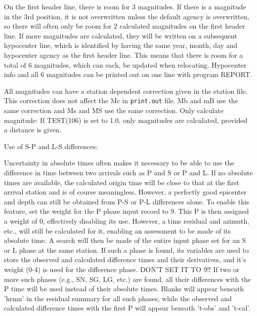 On the first header line, there is room for 3 magnitudes. If there 
is a magnitude in the 3rd position, it is not overwritten unless 
the default agency is overwritten, so there will often only be room 
for 2 calculated magnitudes on the first header line. 
If more 
magnitudes are calculated, they will be written on a subsequent 
hypocenter line, which is identified by having the same year, month, 
day and hypocenter agency as the first header line. This means that 
there is room for a total of 6 magnitudes, which can each, be updated 
when relocating. Hypocenter info and all 6 magnitudes can be printed 
out on one line with program REPORT.

All magnitudes can have a station dependent correction given in the 
station file. This correction does not affect the Mc in \texttt{print.out}
file. Mb and mB use the same correction and Ms and MS use the same correction.
Only calculate magnitude: If TEST(106) is set to 1.0, only magnitudes 
are calculated, provided a distance is given.

Use of S-P and L-S differences: 

Uncertainty in absolute times often makes it necessary to be able to 
use the difference in time between two arrivals such as P and S or 
P and L. If no absolute times are available, the calculated origin 
time will be close to that at the first arrival station and is of 
course meaningless. However, a perfectly good epicenter and depth 
can still be obtained from P-S or P-L differences alone. To enable 
this feature, set the weight for the P phase input record to 9. This 
P is then assigned a weight of 0, effectively disabling its use. 
However, a time residual and azimuth, etc., will still be calculated 
for it, enabling an assessment to be made of its absolute time. A 
search will then be made of the entire input phase set for an S or 
L phase at the same station. If such a phase is found, its variables 
are used to store the observed and calculated difference times and 
their derivatives, and it's weight (0-4) is used for the difference 
phase. DON'T SET IT TO 9!! If two or more such phases (e.g., SN, SG, LG, etc.) 
are found, all their differences with the P time will be used instead 
of their absolute times.  Blanks will appear beneath 'hrmn' in the 
residual summary for all such phases, while the observed and calculated 
difference times with the first P will appear beneath 't-obs' and 't-cal'. 

